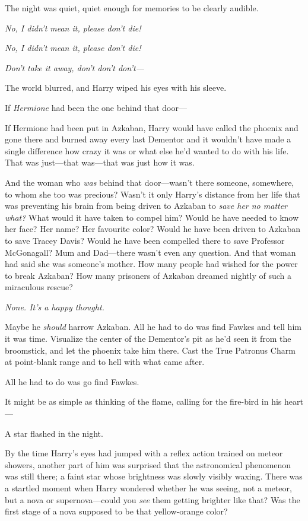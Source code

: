 The night was quiet, quiet enough for memories to be clearly audible.

\emph{No, I didn't mean it, please don't die!}

\emph{No, I didn't mean it, please don't die!}

\emph{Don't take it away, don't don't don't---}

The world blurred, and Harry wiped his eyes with his sleeve.

If \emph{Hermione} had been the one behind that door---

If Hermione had been put in Azkaban, Harry would have called the phoenix and
gone there and burned away every last Dementor and it wouldn't have made a
single difference how crazy it was or what else he'd wanted to do with his
life. That was just---that was---that was just how it was.

And the woman who \emph{was} behind that door---wasn't there someone,
somewhere, to whom she too was precious? Wasn't it only Harry's distance from
her life that was preventing his brain from being driven to Azkaban to
\emph{save her no matter what?} What would it have taken to compel him? Would
he have needed to know her face? Her name? Her favourite color? Would he have
been driven to Azkaban to save Tracey Davis? Would he have been compelled there
to save Professor McGonagall? Mum and Dad---there wasn't even any question. And
that woman had said she was someone's mother. How many people had wished for
the power to break Azkaban? How many prisoners of Azkaban dreamed nightly of
such a miraculous rescue?

\emph{None. It's a happy thought.}

Maybe he \emph{should} harrow Azkaban. All he had to do was find Fawkes and
tell him it was time. Visualize the center of the Dementor's pit as he'd seen
it from the broomstick, and let the phoenix take him there. Cast the True
Patronus Charm at point-blank range and to hell with what came after.

All he had to do was go find Fawkes.

It might be as simple as thinking of the flame, calling for the fire-bird in
his heart---

A star flashed in the night.

By the time Harry's eyes had jumped with a reflex action trained on meteor
showers, another part of him was surprised that the astronomical phenomenon was
still there; a faint star whose brightness was slowly visibly waxing. There was
a startled moment when Harry wondered whether he was seeing, not a meteor, but
a nova or supernova---could you \emph{see} them getting brighter like that? Was
the first stage of a nova supposed to be that yellow-orange color?

